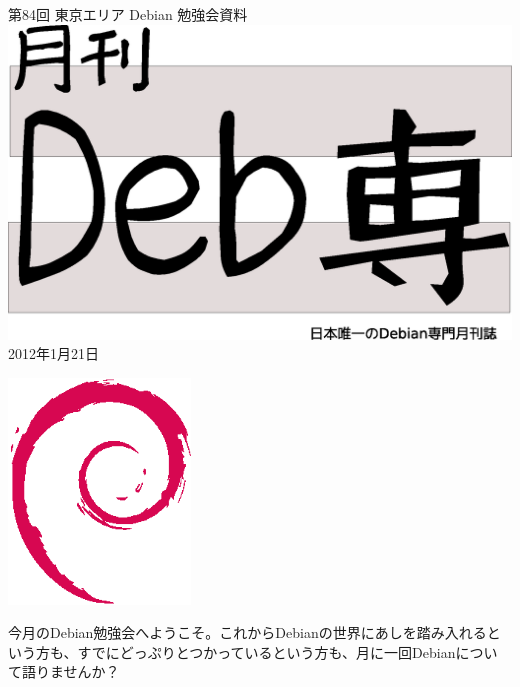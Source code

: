\documentclass[mingoth,a4paper]{jsarticle}
\newcommand{\debmtgyear}{2012}
\newcommand{\debmtgmonth}{1}
\newcommand{\debmtgdate}{21}
\newcommand{\debmtgnumber}{84}
\begin{document}
\begin{titlepage}
\thispagestyle{empty}

\vspace*{-2cm}
第\debmtgnumber{}回 東京エリア Debian 勉強会資料\\
\hspace*{-2cm}
\includegraphics[width=210mm]{image201003/debsen.eps}\\
\hfill{}\debmtgyear{}年\debmtgmonth{}月\debmtgdate{}日


\vspace*{-2cm}
\hfill{}\includegraphics[height=6cm]{image200502/openlogo-nd.eps}
\end{titlepage}



 今月のDebian勉強会へようこそ。これからDebianの世界にあしを踏み入れると
 いう方も、すでにどっぷりとつかっているという方も、月に一回Debianについ
 て語りませんか？
\end{document}
